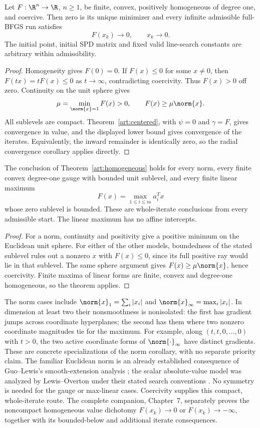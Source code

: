 \begin{theorem}\label{art:homogeneous}
Let $F:\R^n\to\R$, $n\ge1$, be finite, convex, positively homogeneous of
degree one, and coercive. Then zero is its unique minimizer and every
infinite admissible full-BFGS run satisfies
\[
 F(x_k)\longrightarrow0,\qquad x_k\longrightarrow0.
\]
The initial point, initial SPD matrix and fixed valid line-search constants
are arbitrary within admissibility.
\end{theorem}
\begin{proof}
Homogeneity gives $F(0)=0$. If $F(x)\le0$ for some $x\ne0$, then
$F(tx)=tF(x)\le0$ as $t\to\infty$, contradicting coercivity. Thus
$F(x)>0$ off zero. Continuity on the unit sphere gives
\[
 \mu=\min_{\norm{x}=1}F(x)>0,
 \qquad F(x)\ge\mu\norm{x}.
\]
All sublevels are compact. Theorem~\ref{art:centered}, with $\psi=0$ and
$\gamma=F$, gives convergence in value, and the displayed lower bound gives
convergence of the iterates. Equivalently, the inward remainder is identically
zero, so the radial convergence corollary applies directly.
\end{proof}

\begin{corollary}\label{art:homogeneous-examples}
The conclusion of Theorem~\ref{art:homogeneous} holds for every norm, every
finite convex degree-one gauge with bounded unit sublevel, and every finite
linear maximum
\[
 F(x)=\max_{1\le i\le m}a_i^Tx
\]
whose zero sublevel is bounded. These are whole-iterate conclusions from every
admissible start. The linear maximum has no affine intercepts.
\end{corollary}
\begin{proof}
For a norm, continuity and positivity give a positive minimum on the Euclidean
unit sphere. For either of the other models, boundedness of the stated
sublevel rules out a nonzero $x$ with $F(x)\le0$, since its full positive ray
would lie in that sublevel. The same sphere argument gives
$F(x)\ge\mu\norm{x}$, hence coercivity. Finite maxima of linear forms are
finite, convex and degree-one homogeneous, so the theorem applies.
\end{proof}

The norm cases include $\norm{x}_1=\sum_i|x_i|$ and
$\norm{x}_\infty=\max_i|x_i|$. In dimension at least two their nonsmoothness
is nonisolated: the first has gradient jumps across coordinate hyperplanes;
the second has them where two nonzero coordinate magnitudes tie for the
maximum. For example, along $(t,t,0,\ldots,0)$ with $t>0$, the two active
coordinate forms of $\norm{\cdot}_\infty$ have distinct gradients. These
are concrete specializations of the norm corollary, with no separate
priority claim. The familiar
Euclidean norm is an already established consequence of Guo--Lewis's
smooth-extension analysis \cite[Corollary~4.2]{GL18}; the scalar absolute-value
model was analyzed by Lewis--Overton under their stated search conventions
\cite[Section~5.1]{LO}. No symmetry is needed for the gauge or max-linear
cases. Coercivity supplies this compact, whole-iterate route. The complete companion,
Chapter~7, separately proves the noncompact homogeneous value dichotomy
$F(x_k)\to0$ or $F(x_k)\to-\infty$, together with its bounded-below and
additional iterate consequences.
